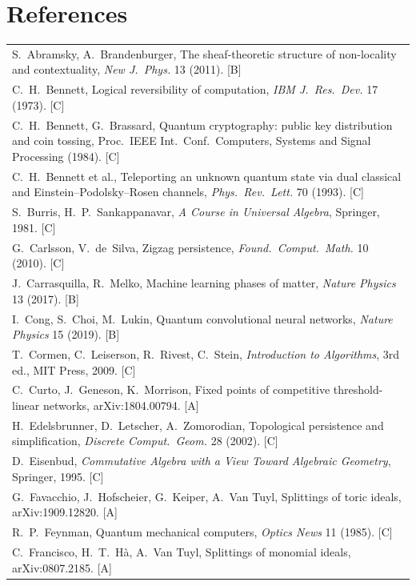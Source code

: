 \documentclass[11pt,a4paper]{article}
\newcommand{\gr}[1]{\textsf{[#1]}}
\begin{document}
\section*{References}
\small
\begin{tabular}{@{}p{}@{}}
S.~Abramsky, A.~Brandenburger, The sheaf-theoretic structure of non-locality and contextuality, \emph{New J.\ Phys.} 13 (2011). \gr{B}\\
C.~H.~Bennett, Logical reversibility of computation, \emph{IBM J.\ Res.\ Dev.} 17 (1973). \gr{C}\\
C.~H.~Bennett, G.~Brassard, Quantum cryptography: public key distribution and coin tossing, Proc.\ IEEE Int.\ Conf.\ Computers, Systems and Signal Processing (1984). \gr{C}\\
C.~H.~Bennett et al., Teleporting an unknown quantum state via dual classical and Einstein--Podolsky--Rosen channels, \emph{Phys.\ Rev.\ Lett.} 70 (1993). \gr{C}\\
S.~Burris, H.~P.~Sankappanavar, \emph{A Course in Universal Algebra}, Springer, 1981. \gr{C}\\
G.~Carlsson, V.~de~Silva, Zigzag persistence, \emph{Found.\ Comput.\ Math.} 10 (2010). \gr{C}\\
J.~Carrasquilla, R.~Melko, Machine learning phases of matter, \emph{Nature Physics} 13 (2017). \gr{B}\\
I.~Cong, S.~Choi, M.~Lukin, Quantum convolutional neural networks, \emph{Nature Physics} 15 (2019). \gr{B}\\
T.~Cormen, C.~Leiserson, R.~Rivest, C.~Stein, \emph{Introduction to Algorithms}, 3rd ed., MIT Press, 2009. \gr{C}\\
C.~Curto, J.~Geneson, K.~Morrison, Fixed points of competitive threshold-linear networks, arXiv:1804.00794. \gr{A}\\
H.~Edelsbrunner, D.~Letscher, A.~Zomorodian, Topological persistence and simplification, \emph{Discrete Comput.\ Geom.} 28 (2002). \gr{C}\\
D.~Eisenbud, \emph{Commutative Algebra with a View Toward Algebraic Geometry}, Springer, 1995. \gr{C}\\
G.~Favacchio, J.~Hofscheier, G.~Keiper, A.~Van Tuyl, Splittings of toric ideals, arXiv:1909.12820. \gr{A}\\
R.~P.~Feynman, Quantum mechanical computers, \emph{Optics News} 11 (1985). \gr{C}\\
C.~Francisco, H.~T.~Hà, A.~Van Tuyl, Splittings of monomial ideals, arXiv:0807.2185. \gr{A}\\

\end{tabular}
\end{document}
